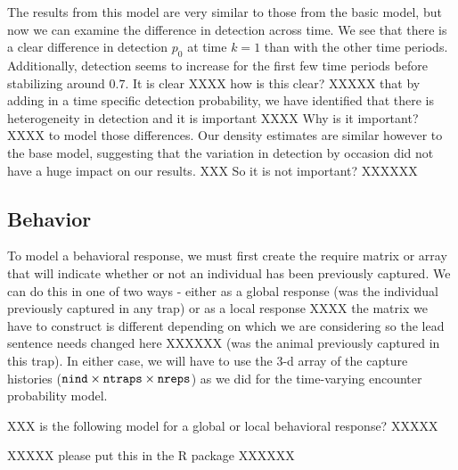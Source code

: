 The results from this model are very similar to those from the basic
model, but now we can examine the difference in detection across time.
We see that there is a clear difference in detection $p_0$ at time $k=1$
than with the other time periods.  Additionally, detection seems to
increase for the first few time periods before stabilizing around $0.7$.
It is clear XXXX how is this clear? XXXXX
that by adding in a time specific detection probability,
we have identified that there is heterogeneity in detection and it is
important XXXX Why is it important? XXXX
to model those differences.  Our density estimates are
similar however to the base model, suggesting that the variation in
detection by occasion did not have a huge impact on our results. XXX
So it is not important? XXXXXX 

\subsection{Behavior}


To model a behavioral response, we must first create the require matrix or
array that will indicate whether or not an individual has been previously
captured.  We can do this in one of two ways - either as a
global response (was the individual previously captured in any trap)
or as a local response XXXX the matrix we have to construct is
different depending on which we are considering so the lead sentence
needs changed here XXXXXX
(was the animal previously captured in this
trap).  In either case, we will have to use the 3-d array of the
capture histories ($\mbox{\tt nind} \times \mbox{\tt ntraps} \times
\mbox{\tt nreps}$) as we did for the time-varying encounter probability
model.  


XXX is the following model for a global or local behavioral response? XXXXX

XXXXX please put this in the R package XXXXXX

